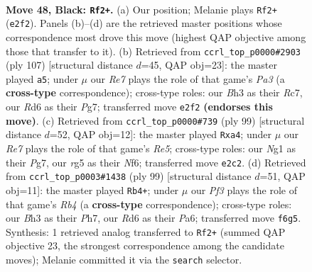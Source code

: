 \documentclass[11pt]{article}
\begin{document}
\clearpage

\begin{figure}[p]\centering
\begin{subfigure}{0.46\textwidth}\centering
\resizebox{\linewidth}{!}{%
\newchessgame
\chessboard[
  setfen={8/7p/3r1p1k/6R1/1p2PKP1/7b/4r3/6n1 b - - 0 48},
  showmover=false,
  pgfstyle=straightmove, color=movearrow, markmove={e2-f2}
]}
\caption{}
\end{subfigure}\hfill
\begin{subfigure}{0.46\textwidth}\centering
\resizebox{\linewidth}{!}{%
\newchessgame
\chessboard[
  setfen={8/2r3p1/pp2b3/4k3/1PP2R2/4K3/4B1P1/8 b - - 5 54},
  showmover=false,
  pgfstyle=straightmove, color=movearrow, markmove={a6-a5}
]}
\caption{}
\end{subfigure}
\\[4pt]
\begin{subfigure}{0.46\textwidth}\centering
\resizebox{\linewidth}{!}{%
\newchessgame
\chessboard[
  setfen={1R6/6pk/3p1n2/p4R1P/P3r3/4p3/2P1K3/8 b - - 6 50},
  showmover=false,
  pgfstyle=straightmove, color=movearrow, markmove={e4-a4}
]}
\caption{}
\end{subfigure}\hfill
\begin{subfigure}{0.46\textwidth}\centering
\resizebox{\linewidth}{!}{%
\newchessgame
\chessboard[
  setfen={8/1p5p/p6k/Pr2R2P/5K2/8/6P1/8 b - - 4 50},
  showmover=false,
  pgfstyle=straightmove, color=movearrow, markmove={b5-b4}
]}
\caption{}
\end{subfigure}
\caption{\textbf{Move 48, Black: \texttt{Rf2+}.} (a) Our position; Melanie plays \texttt{Rf2+} (\texttt{e2f2}). Panels (b)--(d) are the retrieved master positions whose correspondence most drove this move (highest QAP objective among those that transfer to it). (b) Retrieved from \texttt{ccrl\_top\_p0000\#2903} (ply 107) [structural distance $d$=45, QAP obj=23]: the master played \texttt{a5}; under $\mu$ our \emph{Re7} plays the role of that game's \emph{Pa3} (a \textbf{cross-type} correspondence); cross-type roles: our \emph{B}h3 as their \emph{R}c7, our \emph{R}d6 as their \emph{P}g7; transferred move \texttt{e2f2} \textbf{(endorses this move)}. (c) Retrieved from \texttt{ccrl\_top\_p0000\#739} (ply 99) [structural distance $d$=52, QAP obj=12]: the master played \texttt{Rxa4}; under $\mu$ our \emph{Re7} plays the role of that game's \emph{Re5}; cross-type roles: our \emph{N}g1 as their \emph{P}g7, our \emph{r}g5 as their \emph{N}f6; transferred move \texttt{e2c2}. (d) Retrieved from \texttt{ccrl\_top\_p0003\#1438} (ply 99) [structural distance $d$=51, QAP obj=11]: the master played \texttt{Rb4+}; under $\mu$ our \emph{Pf3} plays the role of that game's \emph{Rb4} (a \textbf{cross-type} correspondence); cross-type roles: our \emph{B}h3 as their \emph{P}h7, our \emph{R}d6 as their \emph{P}a6; transferred move \texttt{f6g5}. Synthesis: 1 retrieved analog transferred to \texttt{Rf2+} (summed QAP objective 23, the strongest correspondence among the candidate moves); Melanie committed it via the \texttt{search} selector.}
\label{fig:thought-m95}
\end{figure}
\end{document}
